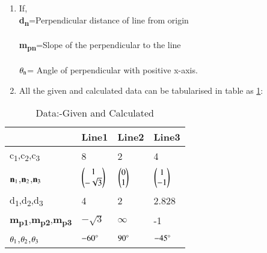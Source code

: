 \documentclass[journal,12pt,twocolumn]{IEEEtran}
\begin{document}
\begin{enumerate}
\item If,
\\
\textbf{d\textsubscript{n}}=Perpendicular distance of line from origin
\\
\\
\textbf{m\textsubscript{pn}}=Slope of the perpendicular to the line 
\\
\\
$\theta\textsubscript{n}$= Angle of perpendicular with positive x-axis.
\\
\item All the given and calculated data can be tabularised in table as \ref{tab:table1}:
\end{enumerate}
\begin{table}[!ht]
\begin{center}
\begin{tabular}{ | m{2cm} | m{1.2cm}| m{1.2cm} | m{1.2cm} |} 
\hline
 & Line1 & Line2 & Line3 \\
\hline
c\textsubscript{1},c\textsubscript{2},c\textsubscript{3} & 8 & 2 & 4 \\ 
\hline
$\vec{n\textsubscript{1}}$,$\vec{n\textsubscript{2}}$,$\vec{n\textsubscript{3}}$ & $\myvec{1\\-\sqrt{3}}$ & $\myvec{0\\1}$ &$\myvec{1\\-1}$ \\ 
\hline
d\textsubscript{1},d\textsubscript{2},d\textsubscript{3} & 4 & 2 & 2.828 \\ 
\hline
\textbf{m\textsubscript{p1}},\textbf{m\textsubscript{p2}},\textbf{m\textsubscript{p3}} & $-\sqrt{3}$ & $\infty$ & -1 \\ 
\hline
$\theta\textsubscript{1}$,$\theta\textsubscript{2}$,$\theta\textsubscript{3}$& $-60\degree$ & $90\degree$ & $-45\degree$ \\ 
\hline
\end{tabular}
\end{center}
\caption{Data:-Given and Calculated}
\label{tab:table1}
\end{table}
\end{document}
